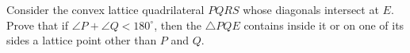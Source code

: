 Consider the convex lattice quadrilateral $PQRS$ whose diagonals intersect at $E$. Prove that if $\angle P+\angle Q<180^\circ$, then the $\triangle PQE$ contains inside it or on one of its sides a lattice point other than $P$ and $Q$.